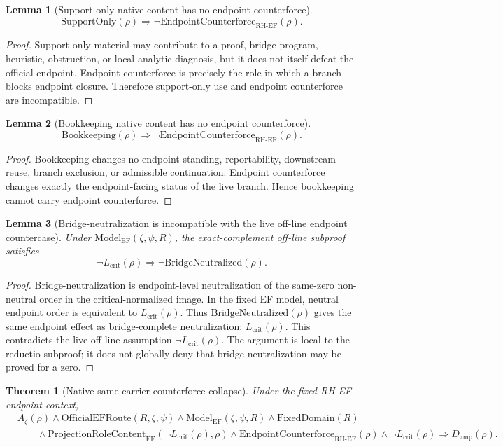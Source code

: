 \documentclass[11pt]{article}
\newtheorem{theorem}{Theorem}[section]
\newtheorem{lemma}{Lemma}[section]
\newcommand{\Az}{A_{\zeta}}
\newcommand{\Lcrit}{L_{\mathrm{crit}}}
\newcommand{\RH}{\mathrm{RH}}
\newcommand{\EF}{\mathrm{EF}}
\newcommand{\FixedDomain}{\mathrm{FixedDomain}}
\newcommand{\ModelEF}{\mathrm{Model}_{\mathrm{EF}}}
\newcommand{\OfficialEFRoute}{\mathrm{OfficialEFRoute}}
\newcommand{\Damp}{D_{\mathrm{amp}}}
\newcommand{\ProjRoleEF}{\mathrm{ProjectionRoleContent}_{\mathrm{EF}}}
\newcommand{\Counterforce}{\mathrm{EndpointCounterforce}}
\newcommand{\Book}{\mathrm{Bookkeeping}}
\newcommand{\Support}{\mathrm{SupportOnly}}
\newcommand{\BridgeNeutralized}{\mathrm{BridgeNeutralized}}
\begin{document}
\begin{lemma}[Support-only native content has no endpoint counterforce]
\[
\Support(\rho)\Rightarrow \neg\Counterforce_{\RH\text{-}\EF}(\rho).
\]
\end{lemma}

\begin{proof}
Support-only material may contribute to a proof, bridge program, heuristic, obstruction, or local analytic diagnosis, but it does not itself defeat the official endpoint.  Endpoint counterforce is precisely the role in which a branch blocks endpoint closure.  Therefore support-only use and endpoint counterforce are incompatible.
\end{proof}

\begin{lemma}[Bookkeeping native content has no endpoint counterforce]
\[
\Book(\rho)\Rightarrow \neg\Counterforce_{\RH\text{-}\EF}(\rho).
\]
\end{lemma}

\begin{proof}
Bookkeeping changes no endpoint standing, reportability, downstream reuse, branch exclusion, or admissible continuation.  Endpoint counterforce changes exactly the endpoint-facing status of the live branch.  Hence bookkeeping cannot carry endpoint counterforce.
\end{proof}

\begin{lemma}[Bridge-neutralization is incompatible with the live off-line endpoint countercase]
Under \(\ModelEF(\zeta,\psi,R)\), the exact-complement off-line subproof satisfies
\[
\neg\Lcrit(\rho)\Rightarrow \neg\BridgeNeutralized(\rho).
\]
\end{lemma}

\begin{proof}
Bridge-neutralization is endpoint-level neutralization of the same-zero non-neutral order in the critical-normalized image.  In the fixed EF model, neutral endpoint order is equivalent to \(\Lcrit(\rho)\).  Thus \(\BridgeNeutralized(\rho)\) gives the same endpoint effect as bridge-complete neutralization: \(\Lcrit(\rho)\).  This contradicts the live off-line assumption \(\neg\Lcrit(\rho)\).  The argument is local to the reductio subproof; it does not globally deny that bridge-neutralization may be proved for a zero.
\end{proof}

\begin{theorem}[Native same-carrier counterforce collapse]
Under the fixed RH-EF endpoint context,
\[
\begin{aligned}
&\Az(\rho)\wedge \OfficialEFRoute(R,\zeta,\psi)\wedge \ModelEF(\zeta,\psi,R)\wedge \FixedDomain(R)\\
&\qquad\wedge\ProjRoleEF(\neg\Lcrit(\rho),\rho)\wedge \Counterforce_{\RH\text{-}\EF}(\rho)
\wedge \neg\Lcrit(\rho)
\Rightarrow \Damp(\rho).
\end{aligned}
\]
\end{theorem}
\end{document}
